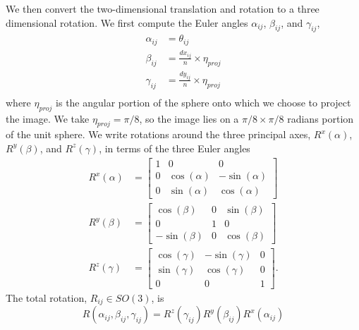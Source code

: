\documentclass{pnastwo}
\begin{document}
\begin{article}
\begin{materials}
%
%
We then convert the two-dimensional translation and rotation to a three dimensional rotation. 
%
We first compute the Euler angles $\alpha_{ij}$, $\beta_{ij}$, and $\gamma_{ij}$,
\begin{equation} \label{eq:angle_relations}
\begin{aligned}
	\alpha_{ij} &= \theta_{ij} \\
	\beta_{ij} &= \frac{dx_{ij}}{n} \times \eta_{proj} \\
	\gamma_{ij} &= \frac{dy_{ij}}{n} \times \eta_{proj} \\
\end{aligned}
\end{equation}
where $\eta_{proj}$ is the angular portion of the sphere onto which we choose to project the image.
%
We take $\eta_{proj} =  \pi/8$, so the image lies on a $\pi/8 \times \pi/8$ radians portion of the unit sphere.
%
We write rotations around the three principal axes, $R^x(\alpha)$, $R^y(\beta)$, and $R^z(\gamma)$, in terms of the three Euler angles
\begin{equation}
\begin{aligned}
	R^x(\alpha) &= \begin{bmatrix}
	1 & 0 & 0 \\
    0 & \cos(\alpha) & -\sin(\alpha) \\
    0 & \sin(\alpha) & \cos(\alpha)
	\end{bmatrix} \\
	R^y(\beta) &= \begin{bmatrix}
	\cos(\beta) & 0 & \sin(\beta) \\
    0 & 1 & 0 \\
    -\sin(\beta) & 0 & \cos(\beta)
    \end{bmatrix} \\
	R^z(\gamma) &= \begin{bmatrix} 
	\cos(\gamma) & -\sin(\gamma) & 0 \\
    \sin(\gamma) & \cos(\gamma) & 0 \\
    0 & 0 & 1 
    \end{bmatrix}.
\end{aligned}
\end{equation}
%
The total rotation, $R_{ij} \in SO(3)$, is 
\begin{equation} \label{eq:total_rot}
	R(\alpha_{ij}, \beta_{ij}, \gamma_{ij})	 = R^z(\gamma_{ij})  R^y(\beta_{ij})  R^x(\alpha_{ij})
\end{equation}
%


\end{materials}
\end{article}
\end{document}
